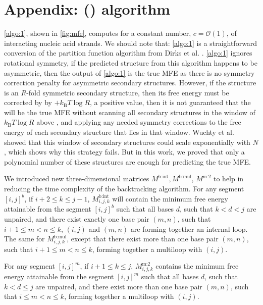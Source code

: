 

\section{Appendix: \SymnMFE  (\snMFE) algorithm}\label{sec:AlgoMFE}

\cref{algo:1}, shown in \cref{fig:mfe}, computes \snMFE  for a constant number, $c=\mathcal{O}(1)$, of interacting nucleic acid strands. 
We should note that: \cref{algo:1} is a straightforward conversion of the partition function algorithm from Dirks et al. \cite{dirks2007thermodynamic}. 
\cref{algo:1} ignores rotational symmetry, 
if the predicted \snMFE structure from this algorithm happens to be asymmetric, 
then the output of \cref{algo:1} is the true MFE as there is no symmetry correction penalty for asymmetric secondary structures.
However, if the \snMFE structure is an $R$-fold symmetric secondary structure, then its free energy must be corrected by by $+k_\mathrm{B} T \log R$, a positive value, then it is not guaranteed that the \snMFE will be the true MFE without scanning all secondary structures in the window of $k_\mathrm{B} T \log R$ above \snMFE, and applying any needed symmetry corrections to the free energy of each secondary structure that lies in that window. Wuchty et al. \cite{wuchty1999complete} showed that this window of secondary structures could scale exponentially with $N$, which shows why this strategy fails. But in this work, we proved that only a polynomial number of these structures are enough for predicting the true MFE. 

We introduced new three-dimensional matrices $M^\text{b:int}, M^\text{b:mul}$,  $M^\text{m:2}$ to help in reducing the time complexity of the backtracking algorithm. For any segment $[i,j]^b$, if $i+2 \leq k \leq j-1$, $M_{i,j,k}^\text{b:int}$ will contain the minimum free energy attainable from the segment $[i,j]^b$ such that all bases $d$, such that $k<d<j$ are unpaired, and there exist exactly one base pair $(m,n)$, such that $i+1 \leq m < n \leq k$, $(i,j)$ and $(m,n)$ are forming together an internal loop. The same for $M_{i,j,k}^\text{b:mul}$, except that there exist more than one base pair $(m,n)$, such that $i+1 \leq m < n \leq k$, forming together a multiloop with $(i,j)$.  


For any segment $[i,j]^m$, if $i+1 \leq k \leq j$, $M_{i,j,k}^\text{m:2}$ contains the minimum free energy attainable from the segment $[i,j]^m$ such that all bases $d$, such that $k<d \leq j$ are unpaired, and there exist more than one base pair $(m,n)$, such that $i \leq m < n \leq k$, forming together a multiloop with $(i,j)$.    






